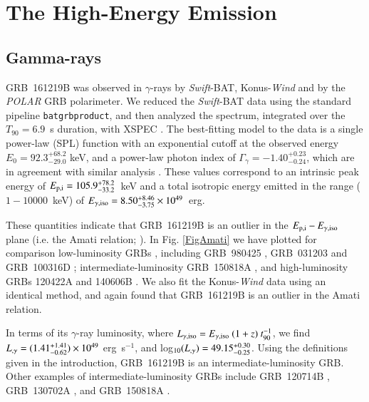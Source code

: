 \documentclass[traditabstract,longauth]{aa}
\begin{document}
\section{The High-Energy Emission}
\label{sec:highenergy}

\subsection{Gamma-rays}

GRB~161219B was observed in $\gamma$-rays by \emph{Swift}-BAT, Konus-\emph{Wind} and by the \emph{POLAR} GRB polarimeter. We reduced the \emph{Swift}-BAT data using the standard pipeline \texttt{batgrbproduct}, and then analyzed the spectrum, integrated over the $T_{90} = 6.9$~s duration, with XSPEC \citep{Arnaud96}. The best-fitting model to the data is a single power-law (SPL) function with an exponential cutoff at the observed energy $E_{0} = 92.3_{-29.0}^{+68.2}$ keV, and a power-law photon index of $\Gamma_{\gamma} = -1.40_{-0.24}^{+0.23}$, which are in agreement with similar analysis \citep{Palmer16}. These values correspond to an intrinsic peak energy of $E_{\rm p,i} = 105.9_{-33.2}^{+78.2}$~keV and a total isotropic energy emitted in the range ($1-10000$~keV) of $E_{\rm \gamma,iso} = 8.50_{-3.75}^{+8.46} \times 10^{49}$~erg. 

These quantities indicate that GRB~161219B is an outlier in the $E_{\rm p,i}-E_{\rm \gamma, iso}$ plane (i.e. the Amati relation; \citealt{Amati02}).  In Fig. \ref{FigAmati} we have  plotted for comparison low-luminosity GRBs \citep{Cano2016,Martone17}, including GRB~980425 \citep{Galama98}, GRB~031203 \citep{Malesani04} and GRB~100316D \citep{Starling11}; intermediate-luminosity GRB~150818A \citep{Palmer15,Golenetskii15}, and high-luminosity GRBs 120422A \citep{Schulze14} and 140606B \citep{Cano15}.  We also fit the Konus-\emph{Wind} data using an identical method, and again found that GRB~161219B is an outlier in the Amati relation.  

In terms of its $\gamma$-ray luminosity, where $L_{\gamma, \rm iso} = E_{\gamma, \rm iso}~(1+z)~t_{90}^{-1}$, we find $L_{\rm, \gamma} = (1.41_{-0.62}^{+1.41}) \times 10^{49}$ erg~s$^{-1}$, and log$_{10}(L_{\rm, \gamma}) = 49.15_{-0.25}^{+0.30}$.  Using the definitions given in the introduction, GRB~161219B is an intermediate-luminosity GRB.  Other examples of intermediate-luminosity GRBs include GRB~120714B \citep{Cummings12,Klose12}, GRB~130702A \citep{Delia15,Toy16}, and GRB~150818A \citep{Palmer15,Golenetskii15,deUgarte15}.
\end{document}
